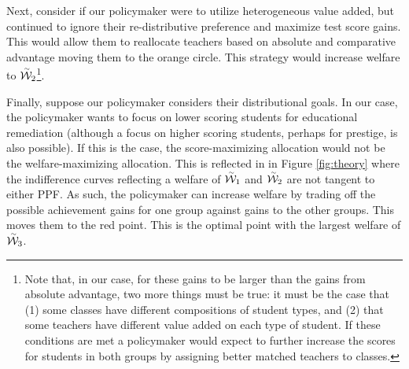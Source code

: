 \documentclass[12pt]{article}
\theoremstyle{definition}
\theoremstyle{definition}
\theoremstyle{definition}
\theoremstyle{definition}
\begin{document}
Next, consider if our policymaker were to utilize heterogeneous value added, but continued to ignore their re-distributive preference and maximize test score gains. This would allow them to reallocate teachers  based on absolute and comparative advantage moving them to the orange circle. This strategy would increase welfare to $\accentset{\sim}{\mathcal{W}}_2$\footnote{Note that, in our case, for these gains to be larger than the gains from absolute advantage, two more things must be true: it must be the case that (1) some classes have different compositions of student types, and (2) that some teachers have different value added on each type of student. If these conditions are met a policymaker would expect to further increase the scores for students in both groups by assigning better matched teachers to classes.}.

Finally, suppose our policymaker considers their distributional goals. In our case, the policymaker wants to focus on lower scoring students for educational remediation (although a focus on higher scoring students, perhaps for prestige, is also possible). If this is the case, the score-maximizing allocation would not be the welfare-maximizing allocation. This is reflected in in Figure \ref{fig:theory} where the indifference curves reflecting a welfare of $\accentset{\sim}{\mathcal{W}}_1$ and $\accentset{\sim}{\mathcal{W}}_2$ are not tangent to either PPF. As such, the policymaker can increase welfare by trading off the possible achievement gains for one group against gains to the other groups. This moves them to the red point. This is the optimal point with the largest welfare of $\accentset{\sim}{\mathcal{W}}_3$.


\end{document}
